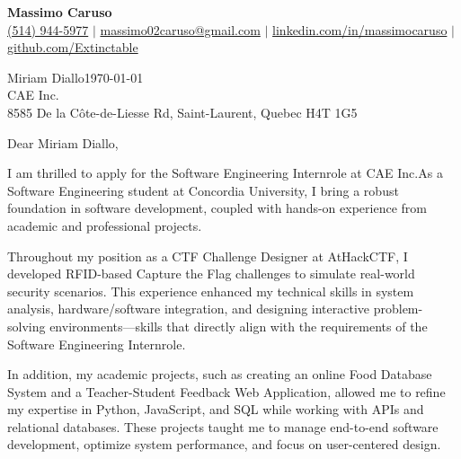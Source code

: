 \documentclass[10pt]{article}
\begin{document}
\newcommand{\fullname}{Massimo Caruso}
\newcommand{\phone}{(514) 944-5977}
\newcommand{\email}{massimo02caruso@gmail.com}
\newcommand{\linkedin}{linkedin.com/in/massimocaruso}
\newcommand{\github}{github.com/Extinctable}

\newcommand*{\hiringManager}{Miriam Diallo}
\newcommand*{\company}{CAE Inc.}
\newcommand*{\address}{8585 De la Côte-de-Liesse Rd, Saint-Laurent, Quebec H4T 1G5}

\newcommand*{\position}{Software Engineering Intern}


\begin{center}
    {\Huge \textbf{\fullname}} \\
    \vspace{1mm}
    {\small 
    \faPhone \hspace{0mm} \href{tel:+15149445977}{\phone} $\vert$ 
    \faEnvelope \hspace{0mm} \href{mailto:massimo02caruso@gmail.com}{\email} $\vert$ 
    \faLinkedin \hspace{0mm} \href{https://linkedin.com/in/massimocaruso}{\linkedin} $\vert$ 
    \faGithub \hspace{0mm} \href{https://github.com/Extinctable}{\github}
    }
\end{center}


\vspace{1.5em}
\hiringManager \hfill \today \\
\company \\
\address 


\vspace{1.5em}
Dear \hiringManager,

I am thrilled to apply for the \position \space role at \company \space As a Software Engineering student at Concordia University, I bring a robust foundation in software development, coupled with hands-on experience from academic and professional projects.

Throughout my position as a CTF Challenge Designer at AtHackCTF, I developed RFID-based Capture the Flag challenges to simulate real-world security scenarios. This experience enhanced my technical skills in system analysis, hardware/software integration, and designing interactive problem-solving environments—skills that directly align with the requirements of the \position \space role.

In addition, my academic projects, such as creating an online Food Database System and a Teacher-Student Feedback Web Application, allowed me to refine my expertise in Python, JavaScript, and SQL while working with APIs and relational databases. These projects taught me to manage end-to-end software development, optimize system performance, and focus on user-centered design.
\end{document}
